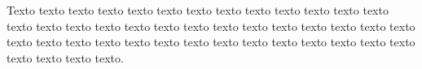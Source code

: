 
Texto texto texto texto texto texto texto texto texto texto texto texto texto texto
texto texto texto texto texto texto texto texto texto texto texto texto texto texto texto
texto texto texto texto texto texto texto texto texto texto texto texto texto texto texto
texto.
